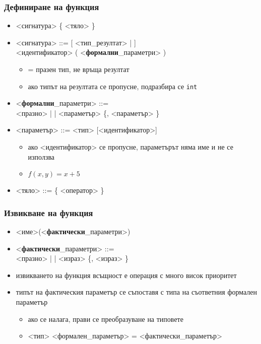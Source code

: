 \documentclass[alsotrans]{beamerswitch}
\begin{document}
\begin{frame}
  \frametitle{Дефиниране на функция}

  \begin{itemize}[<+->]
  \item{} <сигнатура> \tta\{ <тяло> \tta\}
  \item{} <сигнатура> ::= [ <тип\_резултат> |  ]\\
    <идентификатор> \tta( <\textbf{формални}\_параметри> \tta)
    \begin{itemize}
    \item {} = празен тип, не връща резултат
    \item ако типът на резултата се пропусне, подразбира се \tt{int}
    \end{itemize}
  \item{} <\textbf{формални}\_параметри> ::=  \\
    <празно> |  | <параметър> \{\tta, <параметър> \}
  \item{} <параметър> ::= <тип> [<идентификатор>]
    \begin{itemize}
    \item ако <идентификатор> се пропусне, параметърът няма име и не се използва
    \item \exa $f(x,y) = x + 5$
    \end{itemize}
  \item{} <тяло> ::= \{ <оператор> \}
  \end{itemize}
\end{frame}

\begin{frame}
  \frametitle{Извикване на функция}

  \begin{itemize}[<+->]
  \item{} <име>\tta(<\textbf{фактически}\_параметри>\tta)
  \item{} <\textbf{фактически}\_параметри> ::= \\
    <празно> |  | <израз> \{\tta, <израз> \}
  \item извикването на функция всъщност е \alert{операция} с много висок приоритет
  \item типът на фактическия параметър се съпоставя с типа на съответния формален параметър
    \begin{itemize}
    \item ако се налага, прави се преобразуване на типовете
    \item{} <тип> <формален\_параметър> = <фактически\_параметър>
    \end{itemize}
  \end{itemize}
\end{frame}
\end{document}
